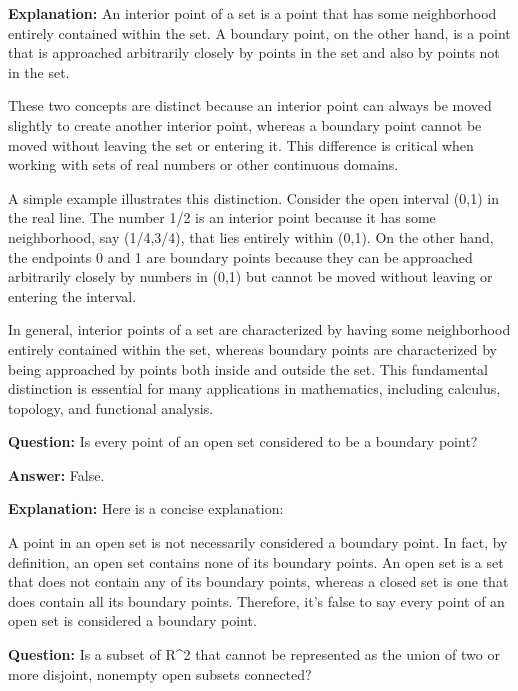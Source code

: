 \documentclass{article}
\begin{document}
                \textbf{Explanation:} An interior point of a set is a point that has some neighborhood entirely contained within the set. A boundary point, on the other hand, is a point that is approached arbitrarily closely by points in the set and also by points not in the set.

These two concepts are distinct because an interior point can always be moved slightly to create another interior point, whereas a boundary point cannot be moved without leaving the set or entering it. This difference is critical when working with sets of real numbers or other continuous domains.

A simple example illustrates this distinction. Consider the open interval (0,1) in the real line. The number 1/2 is an interior point because it has some neighborhood, say (1/4,3/4), that lies entirely within (0,1). On the other hand, the endpoints 0 and 1 are boundary points because they can be approached arbitrarily closely by numbers in (0,1) but cannot be moved without leaving or entering the interval.

In general, interior points of a set are characterized by having some neighborhood entirely contained within the set, whereas boundary points are characterized by being approached by points both inside and outside the set. This fundamental distinction is essential for many applications in mathematics, including calculus, topology, and functional analysis.
                
                \vspace{0.5cm} 
        
            
                \textbf {Question:} Is every point of an open set considered to be a boundary point?
                
                \textbf{Answer:} False.

                \textbf{Explanation:} Here is a concise explanation:

A point in an open set is not necessarily considered a boundary point. In fact, by definition, an open set contains none of its boundary points. An open set is a set that does not contain any of its boundary points, whereas a closed set is one that does contain all its boundary points. Therefore, it's false to say every point of an open set is considered a boundary point.
                
                \vspace{0.5cm} 
        
            
                \textbf {Question:} Is a subset of R{\textasciicircum}2 that cannot be represented as the union of two or more disjoint, nonempty open subsets connected?
                
\end{document}
